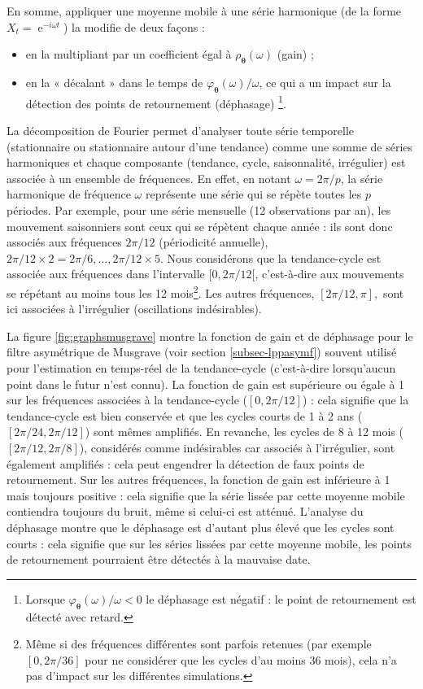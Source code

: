 \documentclass[
  12pt,
  a4paper,french]{article}
\DeclareMathOperator{\e}{e}
\newcommand\1{\mathds{1}}
\begin{document}
En somme, appliquer une moyenne mobile à une série harmonique (de la forme \(X_t=\e^{-i\omega t}\)) la modifie de deux façons :

\begin{itemize}
\item
  en la multipliant par un coefficient égal à \(\rho_{\boldsymbol\theta}\left(\omega\right)\) (gain) ;
\item
  en la « décalant » dans le temps de \(\varphi_{\boldsymbol\theta}(\omega)/\omega\), ce qui a un impact sur la détection des points de retournement (déphasage) \footnote{
    Lorsque \(\varphi_{\boldsymbol\theta}(\omega)/\omega<0\) le déphasage est négatif : le point de retournement est détecté avec retard.}.
\end{itemize}

La décomposition de Fourier permet d'analyser toute série temporelle (stationnaire ou stationnaire autour d'une tendance) comme une somme de séries harmoniques et chaque composante (tendance, cycle, saisonnalité, irrégulier) est associée à un ensemble de fréquences.
En effet, en notant \(\omega = 2\pi/p\), la série harmonique de fréquence \(\omega\) représente une série qui se répète toutes les \(p\) périodes.
Par exemple, pour une série mensuelle (12 observations par an), les mouvement saisonniers sont ceux qui se répètent chaque année : ils sont donc associés aux fréquences \(2\pi/12\) (périodicité annuelle), \(2\pi/12\times 2=2\pi/6,\dots,2\pi/12\times 5.\)
Nous considérons que la tendance-cycle est associée aux fréquences dans l'intervalle \([0, 2\pi/12[\), c'est-à-dire aux mouvements se répétant au moins tous les 12 mois\footnote{
  Même si des fréquences différentes sont parfois retenues (par exemple \([0, 2\pi/36]\) pour ne considérer que les cycles d'au moins 36 mois), cela n'a pas d'impact sur les différentes simulations.}.
Les autres fréquences, \([2\pi/12, \pi],\) sont ici associées à l'irrégulier (oscillations indésirables).

La figure \ref{fig:graphsmusgrave} montre la fonction de gain et de déphasage pour le filtre asymétrique de Musgrave (voir section \ref{subsec-lppasymf}) souvent utilisé pour l'estimation en temps-réel de la tendance-cycle (c'est-à-dire lorsqu'aucun point dans le futur n'est connu).
La fonction de gain est supérieure ou égale à 1 sur les fréquences associées à la tendance-cycle (\([0, 2\pi/12]\)) : cela signifie que la tendance-cycle est bien conservée et que les cycles courts de 1 à 2 ans (\([2\pi/24, 2\pi/12]\)) sont mêmes amplifiés.
En revanche, les cycles de 8 à 12 mois (\([2\pi/12, 2\pi/8]\)), considérés comme indésirables car associés à l'irrégulier, sont également amplifiés : cela peut engendrer la détection de faux points de retournement.
Sur les autres fréquences, la fonction de gain est inférieure à 1 mais toujours positive : cela signifie que la série lissée par cette moyenne mobile contiendra toujours du bruit, même si celui-ci est atténué.
L'analyse du déphasage montre que le déphasage est d'autant plus élevé que les cycles sont courts : cela signifie que sur les séries lissées par cette moyenne mobile, les points de retournement pourraient être détectés à la mauvaise date.
\end{document}
